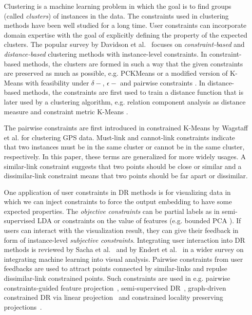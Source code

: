 Clustering is a machine learning problem in which the goal is to find groups (called \emph{clusters}) of instances in the data. The constraints used in clustering methods have been well studied for a long time. User constraints can incorporate domain expertise with the goal of explicitly defining the property of the expected clusters.
The popular survey by Davidson et al.~\cite{Davidson2007surveyClt} focuses on \emph{constraint-based} and \emph{distance-based} clustering methods with instance-level constraints.
In constraint-based methods, the clusters are formed in such a way that the given constraints are preserved as much as possible, e.g. PCKMeans \cite{basu2004active} or a modified version of K-Means with feasibility under $\delta-$, $\epsilon-$ and pairwise constraints \cite{davidson2005clustering}.
In distance-based methods, the constraints are first used to train a distance function that is later used by a clustering algorithm, e.g. relation component analysis as distance measure \cite{bar2003learning} and constraint metric K-Means \cite{xing2003distance}.

The pairwise constraints are first introduced in constrained K-Means by Wagstaff et al. \cite{wagstaff2001constrained} for clustering GPS data. Must-link and cannot-link constraints indicate that two instances must be in the same cluster or cannot be in the same cluster, respectively.
In this paper, these terms are generalized for more widely usages. A similar-link constraint suggests that two points should be close or similar and a dissimilar-link constraint means that two points should be far apart or dissimilar.

One application of user constraints in DR methods is for visualizing data in which we can inject constraints to force the output embedding to have some expected properties.
The \emph{objective constraints} can be partial labels as in semi-supervised LDA \cite{Sugiyama2008SELF} or constraints on the value of features (e.g. bounded PCA \cite{giordani2007bpca}). 
If users can interact with the visualization result, they can give their feedback in form of instance-level \emph{subjective constraints}.
Integrating user interaction into DR methods is reviewed by Sacha et al.~\cite{Sacha2017Interaction} and by Endert et al.~\cite{Endert2017SOTA} in a wider survey on integrating machine learning into visual analysis.
Pairwise constraints from user feedbacks are used to attract points connected by similar-links and repulse dissimilar-link constrained points. Such constraints are used in e.g. pairwise constraints-guided feature projection~\cite{tang2007pairwise}, semi-supervised DR~\cite{zhang2007ssdr}, graph-driven constrained DR via linear projection~\cite{davidson2009gcdr} and constrained locality preserving projections~\cite{cevikalp2008CLPP}.

